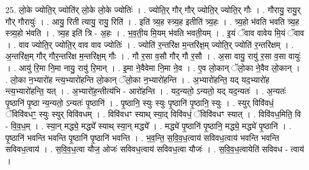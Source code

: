 \documentclass[17pt]{extarticle}
\begin{document}
25. लो॒के ज्योति॒र् ज्योति॑र् लो॒के लो॒के ज्योतिः॑ । . ज्योति॒र् गौर् गौर् ज्योति॒र् ज्योति॒र् गौः । . गौरायु॒ रायु॒र् गौर् गौरायुः॑ । . आयु॒ रिती त्यायु॒ रायु॒ रिति॑ । . इति॑ त्र्य॒ह स्त्र्य॒ह इतीति॑ त्र्य॒हः । . त्र्य॒हो भ॑वति भवति त्र्य॒ह स्त्र्य॒हो भ॑वति । . त्र्य॒ह इति॑ त्रि - अ॒हः । . भ॒व॒ती॒य मि॒यम् भ॑वति भवती॒यम् । . इ॒यं ॅवाव वावेय मि॒यं ॅवाव । . वाव ज्योति॒र् ज्योति॒र् वाव वाव ज्योतिः॑ । . ज्योति॑ र॒न्तरि॑क्ष म॒न्तरि॑क्ष॒म् ज्योति॒र् ज्योति॑ र॒न्तरि॑क्षम् । . अ॒न्तरि॑क्ष॒म् गौर् गौर॒न्तरि॑क्ष म॒न्तरि॑क्ष॒म् गौः । . गौ र॒सा व॒सौ गौर् गौ र॒सौ । . अ॒सा वायु॒ रायु॑ र॒सा व॒सा वायुः॑ । . आयु॑ रि॒मा नि॒मा नायु॒ रायु॑ रि॒मान् । . इ॒मा ने॒वैवेमा नि॒मा ने॒व । . ए॒व लो॒कान् ॅलो॒का ने॒वैव लो॒कान् । . लो॒का न॒भ्यारो॑ह न्त्य॒भ्यारो॑हन्ति लो॒कान् ॅलो॒का न॒भ्यारो॑हन्ति । . अ॒भ्यारो॑हन्ति॒ यद् यद॒भ्यारो॑ह न्त्य॒भ्यारो॑हन्ति॒ यत् । . अ॒भ्यारो॑ह॒न्तीत्य॑भि - आरो॑हन्ति । . यद॒न्यतो॒ ऽन्यतो॒ यद् यद॒न्यतः॑ । . अ॒न्यतः॑ पृ॒ष्ठानि॑ पृ॒ष्ठा न्य॒न्यतो॒ ऽन्यतः॑ पृ॒ष्ठानि॑ । . पृ॒ष्ठानि॒ स्युः स्युः पृ॒ष्ठानि॑ पृ॒ष्ठानि॒ स्युः । . स्युर् विवि॑वधं॒ ॅविवि॑वधꣳ॒॒ स्युः स्युर् विवि॑वधम् । . विवि॑वधꣳ स्याथ् स्या॒द् विवि॑वधं॒ ॅविवि॑वधꣳ स्यात् । . विवि॑वध॒मिति॒ वि - वि॒व॒ध॒म् । . स्या॒न् मद्ध्ये॒ मद्ध्ये᳚ स्याथ् स्या॒न् मद्ध्ये᳚ । . मद्ध्ये॑ पृ॒ष्ठानि॑ पृ॒ष्ठानि॒ मद्ध्ये॒ मद्ध्ये॑ पृ॒ष्ठानि॑ । . पृ॒ष्ठानि॑ भवन्ति भवन्ति पृ॒ष्ठानि॑ पृ॒ष्ठानि॑ भवन्ति । . भ॒व॒न्ति॒ स॒वि॒व॒ध॒त्वाय॑ सविवध॒त्वाय॑ भवन्ति भवन्ति सविवध॒त्वाय॑ । . स॒वि॒व॒ध॒त्वा यौज॒ ओजः॑ सविवध॒त्वाय॑ सविवध॒त्वा यौजः॑ । . स॒वि॒व॒ध॒त्वायेति॑ सविवध - त्वाय॑ । \newline
\end{document}
